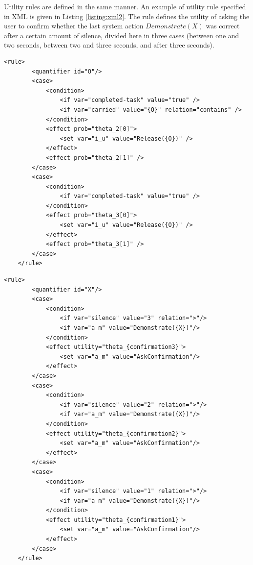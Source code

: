 Utility rules are defined in the same manner.  An example of utility rule specified in XML is given in Listing \ref{listing:xml2}.  The rule defines the utility of asking the user to confirm whether the last system action $\mathit{Demonstrate}(X)$ was correct after a certain amount of silence, divided here in three cases (between one and two seconds, between two and three seconds, and after three seconds).  

\begin{lstlisting}[label=listing:xml1,caption=Example of probability rule in XML format, float=p,captionpos=b]
    <rule>
        <quantifier id="O"/>
        <case>
            <condition>
                <if var="completed-task" value="true" />
                <if var="carried" value="{O}" relation="contains" />
            </condition>
            <effect prob="theta_2[0]">
                <set var="i_u" value="Release({O})" />
            </effect>
            <effect prob="theta_2[1]" />
        </case>
        <case>
            <condition>
                <if var="completed-task" value="true" />
            </condition>
            <effect prob="theta_3[0]">
                <set var="i_u" value="Release({O})" />
            </effect>
            <effect prob="theta_3[1]" />
        </case>
    </rule>
\end{lstlisting}


\begin{lstlisting}[label=listing:xml2,caption=Example of utility rule in XML format, float=p,captionpos=b]
    <rule>
        <quantifier id="X"/>
        <case>
            <condition>
                <if var="silence" value="3" relation=">"/>
                <if var="a_m" value="Demonstrate({X})"/>
            </condition>
            <effect utility="theta_{confirmation3}">
                <set var="a_m" value="AskConfirmation"/>
            </effect>
        </case>
        <case>
            <condition>
                <if var="silence" value="2" relation=">"/>
                <if var="a_m" value="Demonstrate({X})"/>
            </condition>
            <effect utility="theta_{confirmation2}">
                <set var="a_m" value="AskConfirmation"/>
            </effect>
        </case>
        <case>
            <condition>
                <if var="silence" value="1" relation=">"/>
                <if var="a_m" value="Demonstrate({X})"/>
            </condition>
            <effect utility="theta_{confirmation1}">
                <set var="a_m" value="AskConfirmation"/>
            </effect>
        </case>
    </rule>
\end{lstlisting}

